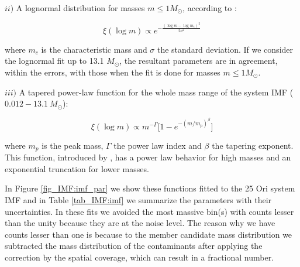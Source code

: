 \documentclass[12pt]{article}
\begin{document}
$ii)$ A lognormal distribution for masses $m\le1M_\odot$, according to \citet{Chabrier2003a,Chabrier2003b}:

\begin{equation}
\xi(\log m)\propto e^{-\frac{(\log m-\log m_c)^2}{2\sigma^2}}
\end{equation}

where $m_c$ is the characteristic mass and $\sigma$ the standard deviation. If we consider the lognormal fit up to 13.1 $M_\odot$, the resultant parameters are in agreement, within the errors, with those when the fit is done for masses $m\le1M_\odot$.

$iii)$ A tapered power-law function for the whole mass range of the system IMF ($0.012-13.1\ M_\odot$):

\begin{equation}
\xi(\log m)\propto m^{-\Gamma} \Big[1-e^{-(m/m_p)^\beta}\Big]
\end{equation}

where $m_p$ is the peak mass, $\Gamma$ the power law index and $\beta$ the tapering exponent. This function, introduced by \citet{DeMarchi2005}, has a power law behavior for high masses and an exponential truncation for lower masses.

In Figure \ref{fig_IMF:imf_par} we show these functions fitted to the 25 Ori system IMF and in Table \ref{tab_IMF:imf} we summarize the parameters with their uncertainties. In these fits we avoided the most massive bin(s) with counts lesser than the unity because they are at the noise level. The reason why we have counts lesser than one is because to the member candidate mass distribution we subtracted the mass distribution of the contaminants after applying the correction by the spatial coverage, which can result in a fractional number.
\end{document}
